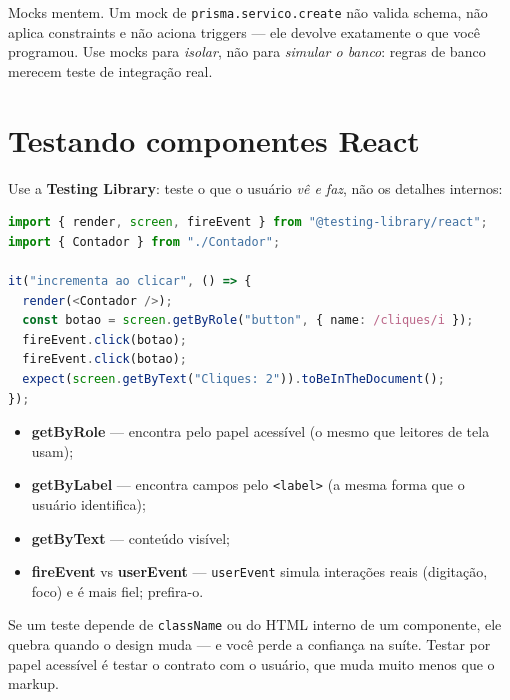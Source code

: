 \begin{caixaarmadilha}
Mocks mentem. Um mock de \texttt{prisma.servico.create} não valida schema,
não aplica constraints e não aciona triggers — ele devolve exatamente o que
você programou. Use mocks para \emph{isolar}, não para \emph{simular o banco}:
regras de banco merecem teste de integração real.
\end{caixaarmadilha}

\section{Testando componentes React}

Use a \textbf{Testing Library}: teste o que o usuário \emph{vê e faz}, não os
detalhes internos:

\begin{lstlisting}[style=livro, language=TypeScript,
  caption={Teste de componente com Testing Library.}, label={list:teste-react}]
import { render, screen, fireEvent } from "@testing-library/react";
import { Contador } from "./Contador";

it("incrementa ao clicar", () => {
  render(<Contador />);
  const botao = screen.getByRole("button", { name: /cliques/i });
  fireEvent.click(botao);
  fireEvent.click(botao);
  expect(screen.getByText("Cliques: 2")).toBeInTheDocument();
});
\end{lstlisting}

\begin{itemize}[leftmargin=*, itemsep=0.4em]
  \item \textbf{getByRole} — encontra pelo papel acessível (o mesmo que leitores de tela usam);
  \item \textbf{getByLabel} — encontra campos pelo \texttt{<label>} (a mesma forma que o usuário identifica);
  \item \textbf{getByText} — conteúdo visível;
  \item \textbf{fireEvent} vs \textbf{userEvent} — \texttt{userEvent} simula interações reais (digitação, foco) e é mais fiel; prefira-o.
\end{itemize}

\begin{caixaconceito}
Se um teste depende de \texttt{className} ou do HTML interno de um componente,
ele quebra quando o design muda — e você perde a confiança na suíte. Testar
por papel acessível é testar o contrato com o usuário, que muda muito menos
que o markup.
\end{caixaconceito}

